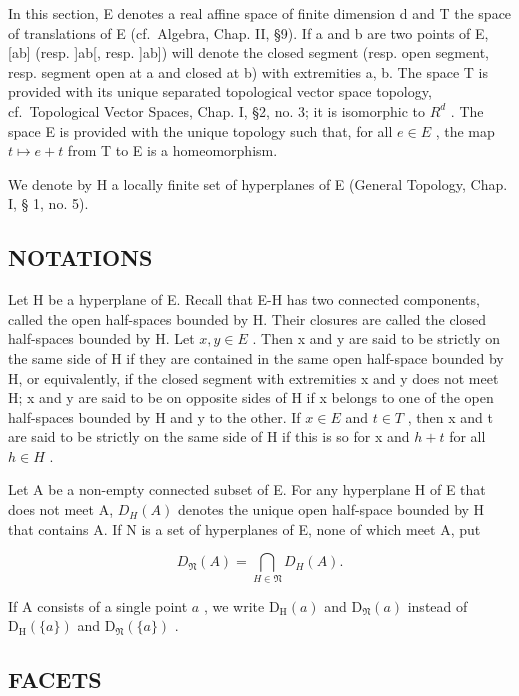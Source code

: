 In this section, E denotes a real affine space of finite dimension d and T the space of translations of E (cf.~Algebra, Chap. II, §9). If a and b are two points of E, {[}ab{]} (resp. {]}ab{[}, resp. {]}ab{]}) will denote the closed segment (resp. open segment, resp. segment open at a and closed at b) with extremities a, b. The space T is provided with its unique separated topological vector space topology, cf.~Topological Vector Spaces, Chap. I, §2, no. 3; it is isomorphic to \(R^{d}\) . The space E is provided with the unique topology such that, for all \(e \in E\) , the map \(t \mapsto e + t\) from T to E is a homeomorphism.

We denote by H a locally finite set of hyperplanes of E (General Topology, Chap. I, § 1, no. 5).

\subsection{NOTATIONS}

Let H be a hyperplane of E. Recall that E-H has two connected components, called the open half-spaces bounded by H. Their closures are called the closed half-spaces bounded by H. Let \(x, y \in E\) . Then x and y are said to be strictly on the same side of H if they are contained in the same open half-space bounded by H, or equivalently, if the closed segment with extremities x and y does not meet H; x and y are said to be on opposite sides of H if x belongs to one of the open half-spaces bounded by H and y to the other. If \(x \in E\) and \(t \in T\) , then x and t are said to be strictly on the same side of H if this is so for x and \(h + t\) for all \(h \in H\) .

Let A be a non-empty connected subset of E. For any hyperplane H of E that does not meet A, \(D_{H}(A)\) denotes the unique open half-space bounded by H that contains A. If N is a set of hyperplanes of E, none of which meet A, put

\[
D _ {\mathfrak {N}} (A) = \bigcap_ {H \in \mathfrak {N}} D _ {H} (A).\tag{1}
\]

If \(\mathrm{A}\) consists of a single point \(a\) , we write \(\mathrm{D_H}(a)\) and \(\mathrm{D}_{\mathfrak{N}}(a)\) instead of \(\mathrm{D_H}(\{a\})\) and \(\mathrm{D}_{\mathfrak{N}}(\{a\})\) .

\subsection{FACETS}

